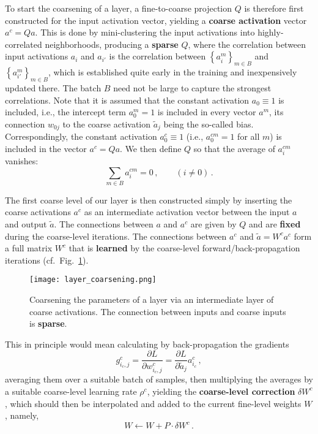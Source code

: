 \documentclass{article} %
\begin{document}
To start the coarsening of a layer, a fine-to-coarse projection $Q$ is therefore first constructed for the input activation vector, yielding a \textbf{coarse activation} vector $a^c = Qa$. This is done by mini-clustering the input activations into highly-correlated neighborhoods, producing a \textbf{sparse} $Q$, where the correlation between input activations $a_i$ and $a_{i'}$ is the correlation between $\left\{a^m_i\right\}_{m \in B}$ and $\left\{a^m_{i'}\right\}_{m \in B}$, which is established quite early in the training and inexpensively updated there. The batch $B$ need not be large to capture the strongest correlations. Note that it is assumed that the constant activation $a_0 \equiv 1$ is included, i.e., the intercept term $a_0^m = 1$ is included in every vector $a^m$, its connection $w_{0j}$ to the coarse activation $\tilde{a}_j$ being the so-called bias. Correspondingly, the constant activation $a_0^c \equiv 1$ (i.e., $a_0^{cm} = 1$ for all $m$) is included in the vector $a^c = Q a$. We then define $Q$ so that the average of $a_i^{cm}$ vanishes:
$$
    \sum_{m \in B} a_i^{cm} = 0\,,\qquad (i \not = 0)\,.
$$

The first coarse level of our layer is then constructed simply by inserting the coarse activations $a^c$ as an intermediate activation vector between the input $a$ and output $\tilde{a}$. The connections between $a$ and $a^c$ are given by $Q$ and are \textbf{fixed} during the coarse-level iterations. The connections between $a^{c}$ and $\tilde{a} = W^c a^c$ form a full matrix $W^c$ that is \textbf{learned} by the coarse-level forward/back-propagation iterations (cf.~Fig.~\ref{fig:layer_coarsening}). 
\begin{figure}[htbp]
  \centering
  \texttt{[image: layer\_coarsening.png]}
  \caption{Coarsening the parameters of a layer via an intermediate layer of coarse activations. The connection between inputs and coarse inputs is \textbf{sparse}.}
  \label{fig:layer_coarsening}
\end{figure}

This in principle would mean calculating by back-propagation the gradients
\begin{equation}
	g^c_{i_c,j} = \frac{\partial L}{\partial w^c_{i_c,j}} =
	\frac{\partial L}{\partial \tilde{a}_j} a^c_{i_c}\,,
	\label{gc}
\end{equation}
averaging them over a suitable batch of samples, then multiplying the averages by a suitable coarse-level learning rate $\rho^c$, yielding the \textbf{coarse-level correction} $\delta W^c$, which should then be interpolated and added to the current fine-level weights $W$, namely,
\begin{equation}
	W \longleftarrow W + P \cdot \delta W^c\,.
	\label{w_correction}
\end{equation}
\end{document}
